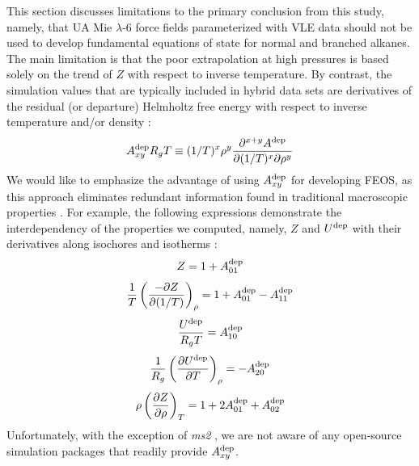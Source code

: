 \documentclass[journal=jctc,manuscript=article]{achemso}
\begin{document}
This section discusses limitations to the primary conclusion from this study, namely, that UA Mie $\lambda$-6 force fields parameterized with VLE data should not be used to develop fundamental equations of state for normal and branched alkanes. The main limitation is that the poor extrapolation at high pressures is based solely on the trend of $Z$ with respect to inverse temperature. By contrast, the simulation values that are typically included in hybrid data sets are derivatives of the residual (or departure) Helmholtz free energy with respect to inverse temperature and/or density \cite{Thol2016_siloxane_first,Thol2016_siloxane,Thol2017,Rutkai2013,Thol2015}:
\begin{equation} \label{Residual Derivatives}
A_{xy}^{\rm dep} R_gT \equiv (1/T)^x\rho^y \frac{\partial^{x+y}A^{\rm dep}}{\partial(1/T)^x \partial \rho^y}
\end{equation}
We would like to emphasize the advantage of using $A_{xy}^{\rm dep}$ for developing FEOS, as this approach eliminates redundant information found in traditional macroscopic properties \cite{Thol2016_LJ,Rutkai2017,Lustig2015,Rutkai2013,Rutkai2015}. For example, the following expressions demonstrate the interdependency of the properties we computed, namely, $Z$ and $U^{\rm dep}$ with their derivatives along isochores and isotherms \cite{Rutkai2015}:
\begin{equation} \label{eq:Z}
Z = 1 + A_{01}^{\rm dep}
\end{equation}
\begin{equation} \label{eq:Z_IC}
\frac{1}{T} \left(\frac{-\partial Z}{\partial(1/T)}\right)_\rho = 1 + A_{01}^{\rm dep} - A_{11}^{\rm dep}
\end{equation}
\begin{equation} \label{eq:U}
\frac{U^{\rm dep}}{R_gT} = A_{10}^{\rm dep}
\end{equation}
\begin{equation} \label{eq:U_IC}
\frac{1}{R_g} \left(\frac{\partial U^{\rm dep}}{\partial T}\right)_\rho = -A_{20}^{\rm dep} 
\end{equation} 
\begin{equation} \label{eq:Z_IT}
\rho \left(\frac{\partial Z}{\partial \rho}\right)_T = 1 + 2 A_{01}^{\rm dep} + A_{02}^{\rm dep} 
\end{equation}
Unfortunately, with the exception of \textit{ms2} \cite{ms2}, we are not aware of any open-source simulation packages that readily provide $A_{xy}^{\rm dep}$. 
\end{document}
